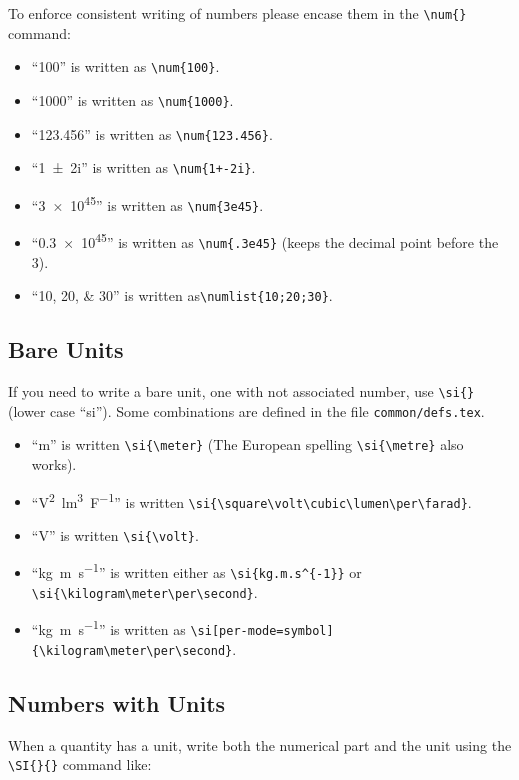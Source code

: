 To enforce consistent writing of numbers please encase them in the
\verb|\num{}| command:

\begin{itemize}
\item ``\num{100}'' is written as \verb|\num{100}|.
\item ``\num{1000}'' is written as \verb|\num{1000}|.
\item ``\num{123.456}'' is written as \verb|\num{123.456}|.
\item ``\num{1+-2i}'' is written as \verb|\num{1+-2i}|.
\item ``\num{3e45}'' is written as \verb|\num{3e45}|.
\item ``\num{.3e45}'' is written as \verb|\num{.3e45}| (keeps the decimal point before the 3).
\item ``\numlist{10;20;30}'' is written as\verb|\numlist{10;20;30}|.
\end{itemize}

\subsection{Bare Units}

If you need to write a bare unit, one with not associated number, use \verb|\si{}| (lower case ``si''). Some combinations are
defined in the file \texttt{common/defs.tex}.


\begin{itemize}
\item ``\si{\meter}'' is written \verb|\si{\meter}| (The European spelling \verb|\si{\metre}| also works).
\item ``\si{\square\volt\cubic\lumen\per\farad}'' is written \verb|\si{\square\volt\cubic\lumen\per\farad}|.
\item  ``\si{\volt}'' is written \verb|\si{\volt}|.
\item  ``\si{kg.m.s^{-1}}'' is written either as \verb|\si{kg.m.s^{-1}}| or  \verb|\si{\kilogram\meter\per\second}|.
\item  ``\si{kg.m.s^{-1}}'' is written as \verb|\si[per-mode=symbol]{\kilogram\meter\per\second}|. 
\end{itemize}

\subsection{Numbers with Units}

When a quantity has a unit, write both the numerical part and the unit
using the \verb|\SI{}{}| command like:

